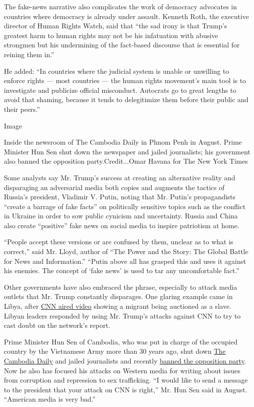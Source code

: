The fake-news narrative also complicates the work of democracy advocates
in countries where democracy is already under assault. Kenneth Roth, the
executive director of Human Rights Watch, said that ``the sad irony is
that Trump's greatest harm to human rights may not be his infatuation
with abusive strongmen but his undermining of the fact-based discourse
that is essential for reining them in.''

He added: ``In countries where the judicial system is unable or
unwilling to enforce rights --- most countries --- the human rights
movement's main tool is to investigate and publicize official
misconduct. Autocrats go to great lengths to avoid that shaming, because
it tends to delegitimize them before their public and their peers.''

Image

Inside the newsroom of The Cambodia Daily in Phnom Penh in August. Prime
Minister Hun Sen shut down the newspaper and jailed journalists; his
government also banned the opposition party.Credit...Omar Havana for The
New York Times

Some analysts say Mr. Trump's success at creating an alternative reality
and disparaging an adversarial media both copies and augments the
tactics of Russia's president, Vladimir V. Putin, noting that Mr.
Putin's propagandists ``create a barrage of fake facts'' on politically
sensitive topics such as the conflict in Ukraine in order to sow public
cynicism and uncertainty. Russia and China also create ``positive'' fake
news on social media to inspire patriotism at home.

``People accept these versions or are confused by them, unclear as to
what is correct,'' said Mr. Lloyd, author of ``The Power and the Story:
The Global Battle for News and Information.'' ``Putin above all has
grasped this and uses it against his enemies. The concept of `fake news'
is used to tar any uncomfortable fact.''

Other governments have also embraced the phrase, especially to attack
media outlets that Mr. Trump constantly disparages. One glaring example
came in Libya, after
\href{https://www.nytimes3xbfgragh.onion/2017/11/19/world/africa/libya-migrants-slavery.html}{CNN
aired video} showing a migrant being auctioned as a slave. Libyan
leaders responded by using Mr. Trump's attacks against CNN to try to
cast doubt on the network's report.

Prime Minister Hun Sen of Cambodia, who was put in charge of the
occupied country by the Vietnamese Army more than 30 years ago, shut
down
\href{https://www.nytimes3xbfgragh.onion/2017/09/03/world/asia/cambodia-daily-newspaper.html}{The
Cambodia Daily} and jailed journalists and recently
\href{https://www.nytimes3xbfgragh.onion/2017/11/16/world/asia/cambodia-court-opposition.html}{banned
the opposition party}. Now he also has focused his attacks on Western
media for writing about issues from corruption and repression to sex
trafficking. ``I would like to send a message to the president that your
attack on CNN is right,'' Mr. Hun Sen said in August. ``American media
is very bad.''


